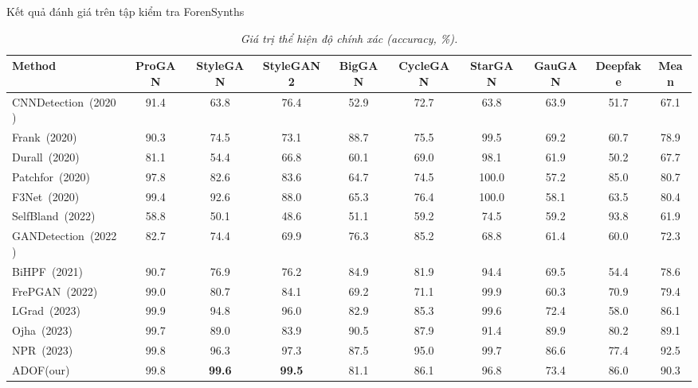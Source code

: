 \begin{table}[h]%
\scriptsize 
\centering
\renewcommand{\arraystretch}{1.2} %
\caption{Kết quả đánh giá trên tập kiểm tra ForenSynths}
\caption*{\textit{Giá trị thể hiện độ chính xác (accuracy, \%).}}
\label{tab:table1}
\begin{adjustbox}{max width=\textwidth}
\begin{tabular}{|l| cc cc cc cc| c|}
\hline
\multirow{1}{*}{\textbf{Method}} & \multicolumn{1}{c}{\textbf{ProGAN}} & \multicolumn{1}{c}{\textbf{StyleGAN}} & \multicolumn{1}{c}{\textbf{StyleGAN2}} & \multicolumn{1}{c}{\textbf{BigGAN}} & \multicolumn{1}{c}{\textbf{CycleGAN}} & \multicolumn{1}{c}{\textbf{StarGAN}} & \multicolumn{1}{c}{\textbf{GauGAN}} & \multicolumn{1}{c|}{\textbf{Deepfake}} & \multicolumn{1}{c|}{\textbf{Mean}} \\ 
\hline
CNNDetection~\cite{Wang2019CNNGeneratedIA}(2020) & 91.4 & 63.8 & 76.4 & 52.9 & 72.7 & 63.8 & 63.9  & 51.7 & 67.1 \\ 
Frank~\cite{Frank2020LeveragingFA}(2020) & 90.3 & 74.5 & 73.1 & 88.7 & 75.5 & 99.5 		& 69.2   & 60.7 & 78.9  \\ 
Durall~\cite{Durall2020WatchYU}(2020) & 81.1 & 54.4 & 66.8 & 60.1 & 69.0 & 98.1    		& 61.9 & 50.2 & 67.7  \\ 
Patchfor~\cite{Chai2020WhatMF}(2020) & 97.8 & 82.6 & 83.6 & 64.7 & 74.5 & 100.0    		& 57.2  & 85.0 & 80.7  \\ 
F3Net~\cite{Qian2020ThinkingIF}(2020) & 99.4 & 92.6 & 88.0 & 65.3 & 76.4 & 100.0  		& 58.1  & 63.5 & 80.4 \\ 
SelfBland~\cite{Shiohara2022DetectingDW}(2022) & 58.8 & 50.1 & 48.6 & 51.1 & 59.2 & 74.5    & 59.2   & 93.8 & 61.9\\ 
GANDetection~\cite{Mandelli2022DetectingGI}(2022) & 82.7 & 74.4 & 69.9 & 76.3 & 85.2 & 68.8 & 61.4   & 60.0 & 72.3  \\ 
BiHPF~\cite{Jeong2021BiHPFBH}(2021) & 90.7 & 76.9 & 76.2 & 84.9 & 81.9 & 94.4 			  & 69.5  & 54.4 & 78.6 \\ 
FrePGAN~\cite{Jeong2022FrePGANRD}(2022) & 99.0 & 80.7 & 84.1 & 69.2 & 71.1 & 99.9  		  & 60.3  & 70.9 & 79.4 \\ 
LGrad~\cite{Tan2023LearningOG}(2023) & 99.9 & 94.8 & 96.0 & 82.9 & 85.3 & 99.6  & 72.4  & 58.0 & 86.1 \\ 
Ojha~\cite{Ojha2023TowardsUF}(2023) & 99.7 & 89.0 & 83.9 & 90.5 & 87.9 & 91.4   & 89.9  & 80.2 & 89.1 \\ 
NPR~\cite{Tan2023RethinkingTU}(2023) & 99.8 & 96.3 & 97.3 & 87.5 & 95.0 & 99.7  & 86.6  & 77.4 & 92.5 \\ 
{ADOF(our)} & 99.8 & \textbf{99.6} & \textbf{99.5} & 81.1 & 86.1 & 96.8   & 73.4  & 86.0 & 90.3  \\ 
\hline
\end{tabular}
\end{adjustbox}
\end{table}





